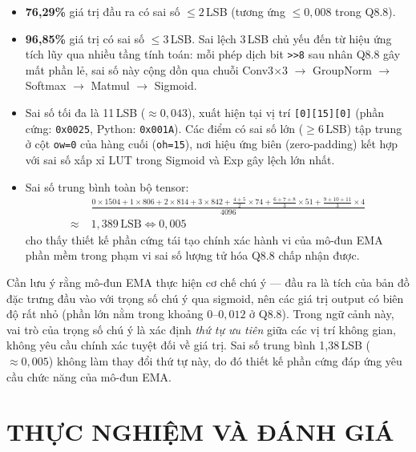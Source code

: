 \documentclass{uetgraduation}
\begin{document}
\begin{itemize}
    \item \textbf{76{,}29\%} giá trị đầu ra có sai số $\leq 2$\,LSB
    (tương ứng $\leq 0{,}008$ trong Q8.8).

    \item \textbf{96{,}85\%} giá trị có sai số $\leq 3$\,LSB. Sai lệch 3\,LSB
    chủ yếu đến từ hiệu ứng tích lũy qua nhiều tầng tính toán: mỗi phép dịch bit
    \texttt{>>8} sau nhân Q8.8 gây mất phần lẻ, sai số này cộng dồn qua
    chuỗi Conv3$\times$3 $\to$ GroupNorm $\to$ Softmax $\to$ Matmul $\to$ Sigmoid.

    \item Sai số tối đa là 11\,LSB ($\approx 0{,}043$), xuất hiện tại vị trí
    \texttt{[0][15][0]} (phần cứng: \texttt{0x0025}, Python: \texttt{0x001A}).
    Các điểm có sai số lớn ($\geq 6$\,LSB) tập trung ở
    cột \texttt{ow=0} của hàng cuối (\texttt{oh=15}), nơi hiệu ứng biên
    (zero-padding) kết hợp với sai số xấp xỉ LUT trong Sigmoid và Exp gây
    lệch lớn nhất.

    \item Sai số trung bình toàn bộ tensor:
    \begin{align*}
                &\frac{0 \times 1504 + 1 \times 806 + 2 \times 814
                       + 3 \times 842 + \frac{4+5}{2} \times 74
                       + \frac{6+7+8}{3} \times 51 + \frac{9+10+11}{3} \times 4}{4096} \\
                \approx\; & 1{,}389\,\text{LSB} \Leftrightarrow 0{,}005
    \end{align*}
    cho thấy thiết kế phần cứng tái tạo chính xác
    hành vi của mô-đun EMA phần mềm trong phạm vi sai số lượng tử hóa Q8.8
    chấp nhận được.
\end{itemize}
Cần lưu ý rằng mô-đun EMA thực hiện cơ chế chú ý --- đầu ra là tích của
bản đồ đặc trưng đầu vào với trọng số chú ý qua sigmoid, nên các giá trị output
có biên độ rất nhỏ (phần lớn nằm trong khoảng $0$--$0{,}012$ ở Q8.8). Trong
ngữ cảnh này, vai trò của trọng số chú ý là xác định \textit{thứ tự ưu tiên}
giữa các vị trí không gian, không yêu cầu chính xác tuyệt đối về giá trị. Sai
số trung bình 1{,}38\,LSB ($\approx 0{,}005$) không làm thay đổi thứ tự này,
do đó thiết kế phần cứng đáp ứng yêu cầu chức năng của mô-đun EMA.

\chapter{THỰC NGHIỆM VÀ ĐÁNH GIÁ}
\end{document}
